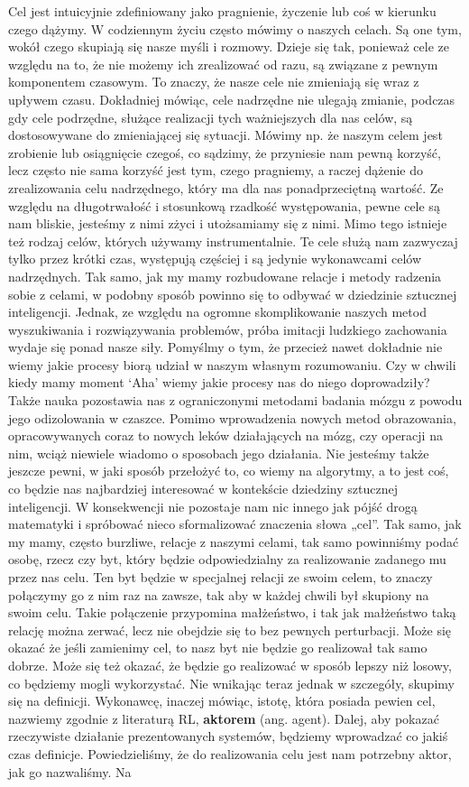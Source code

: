 Cel jest intuicyjnie zdefiniowany jako pragnienie, życzenie lub coś w kierunku czego dążymy. W codziennym życiu często mówimy o naszych celach. Są one tym, wokół czego skupiają się nasze myśli i rozmowy. Dzieje się tak, ponieważ cele ze względu na to, że nie możemy ich zrealizować od razu, są związane z pewnym komponentem czasowym. To znaczy, że nasze cele nie zmieniają się wraz z upływem czasu. Dokładniej mówiąc, cele nadrzędne nie ulegają zmianie, podczas gdy cele podrzędne, służące realizacji tych ważniejszych dla nas celów, są dostosowywane do zmieniającej się sytuacji. Mówimy np. że naszym celem jest zrobienie lub osiągnięcie czegoś, co sądzimy, że przyniesie nam pewną korzyść, lecz często nie sama korzyść jest tym, czego pragniemy, a raczej dążenie do zrealizowania celu nadrzędnego, który ma dla nas ponadprzeciętną wartość. Ze względu na długotrwałość i stosunkową rzadkość występowania, pewne cele są nam bliskie, jesteśmy z nimi zżyci i utożsamiamy się z nimi. Mimo tego istnieje też rodzaj celów, których używamy instrumentalnie. Te cele służą nam zazwyczaj tylko przez krótki czas, występują częściej i są jedynie wykonawcami celów nadrzędnych. Tak samo, jak my mamy rozbudowane relacje i metody radzenia sobie z celami, w podobny sposób powinno się to odbywać w dziedzinie sztucznej inteligencji. Jednak, ze względu na ogromne skomplikowanie naszych metod wyszukiwania i rozwiązywania problemów, próba imitacji ludzkiego zachowania wydaje się ponad nasze siły. Pomyślmy o tym, że przecież nawet dokładnie nie wiemy jakie procesy biorą udział w naszym własnym rozumowaniu. Czy w chwili kiedy mamy moment ‘Aha’ wiemy jakie procesy nas do niego doprowadziły? Także nauka pozostawia nas z ograniczonymi metodami badania mózgu z powodu jego odizolowania w czaszce. Pomimo wprowadzenia nowych metod obrazowania, opracowywanych coraz to nowych leków działających na mózg, czy operacji na nim, wciąż niewiele wiadomo o sposobach jego działania. Nie jesteśmy także jeszcze pewni, w jaki sposób przełożyć to, co wiemy na algorytmy, a to jest coś, co będzie nas najbardziej interesować w kontekście dziedziny sztucznej inteligencji. W konsekwencji nie pozostaje nam nic innego jak pójść drogą matematyki i spróbować nieco sformalizować znaczenia słowa „cel”. Tak samo, jak my mamy, często burzliwe, relacje z naszymi celami, tak samo powinniśmy podać osobę, rzecz czy byt, który będzie odpowiedzialny za realizowanie zadanego mu przez nas celu. Ten byt będzie w specjalnej relacji ze swoim celem, to znaczy połączymy go z nim raz na zawsze, tak aby w każdej chwili był skupiony na swoim celu. Takie połączenie przypomina małżeństwo, i tak jak małżeństwo taką relację można zerwać, lecz nie obejdzie się to bez pewnych perturbacji. Może się okazać że jeśli zamienimy cel, to nasz byt nie będzie go realizował tak samo dobrze. Może się też okazać, że będzie go realizować w sposób lepszy niż losowy, co będziemy mogli wykorzystać. Nie wnikając teraz jednak w szczegóły, skupimy się na definicji. Wykonawcę, inaczej mówiąc, istotę, która posiada pewien cel, nazwiemy zgodnie z literaturą RL, \textbf{aktorem} (ang. agent). Dalej, aby pokazać rzeczywiste działanie prezentowanych systemów, będziemy wprowadzać co jakiś czas definicje. Powiedzieliśmy, że do realizowania celu jest nam potrzebny aktor, jak go nazwaliśmy. Na 